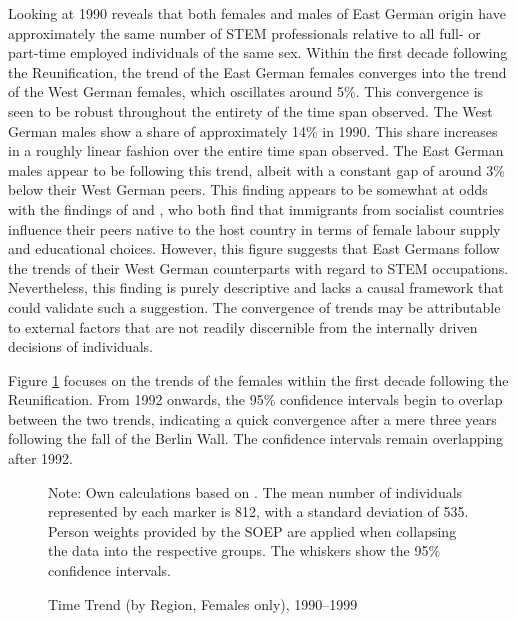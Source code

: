 \documentclass[a4paper, oneside, hyperfootnotes = false]{article}
\begin{document}
{Looking at 1990 reveals that both females and males of East German origin have approximately the same number of STEM professionals relative to all full- or part-time employed individuals of the same sex.
Within the first decade following the Reunification, the trend of the East German females converges into the trend of the West German females, which oscillates around 5\%.
This convergence is seen to be robust throughout the entirety of the time span observed.
The West German males show a share of approximately 14\% in 1990.
This share increases in a roughly linear fashion over the entire time span observed.
The East German males appear to be following this trend, albeit with a constant gap of around 3\% below their West German peers.
This finding appears to be somewhat at odds with the findings of \cite{Jessen2023} and \cite{FriedmanSokuler2020}, who both find that immigrants from socialist countries influence their peers native to the host country in terms of female labour supply and educational choices.
However, this figure suggests that East Germans follow the trends of their West German counterparts with regard to STEM occupations.
Nevertheless, this finding is purely descriptive and lacks a causal framework that could validate such a suggestion.
The convergence of trends may be attributable to external factors that are not readily discernible from the internally driven decisions of individuals.

Figure \ref{fig:timetrendzoom} focuses on the trends of the females within the first decade following the Reunification.
From 1992 onwards, the 95\% confidence intervals begin to overlap between the two trends, indicating a quick convergence after a mere three years following the fall of the Berlin Wall.
The confidence intervals remain overlapping after 1992.

\begin{figure}[ht]
	\centering
	\caption{Time Trend (by Region, Females only), 1990--1999}
	\label{fig:timetrendzoom}
	\fontsize{9pt}{11pt}\selectfont
	\def\svgwidth{.9\textwidth}
	
	\vspace{2mm}
	\parbox{10cm}{
		\linespread{1}\footnotesize Note: Own calculations based on \cite{SOEP2023}. The mean number of individuals represented by each marker is 812, with a standard deviation of 535. Person weights provided by the SOEP are applied when collapsing the data into the respective groups. The whiskers show the 95\% confidence intervals.}
\end{figure}

}
\end{document}
